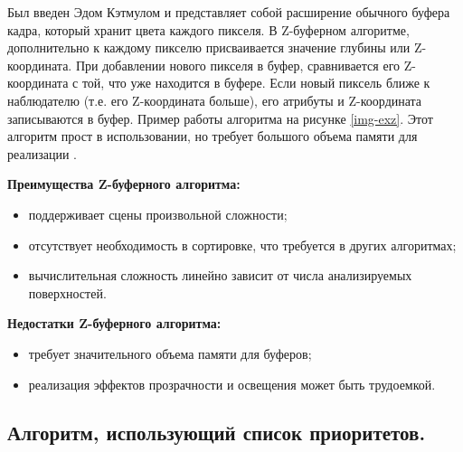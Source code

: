 Был введен Эдом Кэтмулом и представляет собой расширение обычного буфера кадра, который хранит цвета каждого пикселя. В Z-буферном алгоритме, дополнительно к каждому пикселю присваивается значение глубины или Z-координата. При добавлении нового пикселя в буфер, сравнивается его Z-координата с той, что уже находится в буфере. Если новый пиксель ближе к наблюдателю (т.е. его Z-координата больше), его атрибуты и Z-координата записываются в буфер. Пример работы алгоритма на рисунке \ref{img-exz}. Этот алгоритм прост в использовании, но требует большого объема памяти для реализации \cite{del_line}. 


\textbf{Преимущества Z-буферного алгоритма:}
\begin{itemize}
\item поддерживает сцены произвольной сложности;
\item отсутствует необходимость в сортировке, что требуется в других алгоритмах;
\item вычислительная сложность линейно зависит от числа анализируемых поверхностей.
\end{itemize}

\textbf{Недостатки Z-буферного алгоритма:}
\begin{itemize}
\item требует значительного объема памяти для буферов;
\item реализация эффектов прозрачности и освещения может быть трудоемкой.
\end{itemize}




\subsection{Алгоритм, использующий список приоритетов.}


